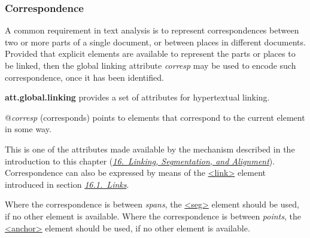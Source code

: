 \subsubsection[{Correspondence}]{Correspondence}\label{SACS1}\par
A common requirement in text analysis is to represent correspondences between two or more parts of a single document, or between places in different documents. Provided that explicit elements are available to represent the parts or places to be linked, then the global linking attribute {\itshape corresp} may be used to encode such correspondence, once it has been identified. 
\begin{sansreflist}
  
\item [\textbf{att.global.linking}] provides a set of attributes for hypertextual linking.\hfil\\[-10pt]\begin{sansreflist}
    \item[@{\itshape corresp}]
  (corresponds) points to elements that correspond to the current element in some way.
\end{sansreflist}  
\end{sansreflist}
 This is one of the attributes made available by the mechanism described in the introduction to this chapter (\textit{\hyperref[SA]{16.\ Linking, Segmentation, and Alignment}}). Correspondence can also be expressed by means of the \hyperref[TEI.link]{<link>} element introduced in section \textit{\hyperref[SAPT]{16.1.\ Links}}.\par
Where the correspondence is between \textit{spans}, the \hyperref[TEI.seg]{<seg>} element should be used, if no other element is available. Where the correspondence is between \textit{points}, the \hyperref[TEI.anchor]{<anchor>} element should be used, if no other element is available.\par
